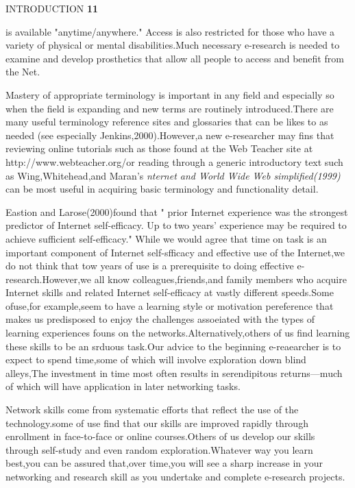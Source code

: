 \documentclass[10pt,a4paper]{book}
\begin{document}
\begin{flushright}
  INTRODUCTION \quad \textbf{11}
\end{flushright}


\!\!\!\!\!\!\!\!\!is available "anytime/anywhere." Access is also restricted for those who have a variety of physical or mental disabilities.Much necessary e-research is needed to examine and develop prosthetics that allow all people to access and benefit from the Net.


Mastery of appropriate terminology is important in any field and especially so when the field is expanding and new terms are routinely introduced.There are many useful terminology reference sites and glossaries that can be likes to as needed (see especially Jenkins,2000).However,a new e-researcher may fins that reviewing online tutorials such as those found at the Web Teacher site at http://www.webteacher.org/or reading through a generic introductory text such as Wing,Whitehead,and Maran's \textmd{\textit{nternet and World Wide Web simplified(1999)}} can be most useful in acquiring basic terminology and functionality detail.

Eastion and Larose(2000)found that " prior Internet experience was the strongest predictor of Internet self-efficacy. Up to two years' experience may be required to achieve sufficient self-efficacy." While we would agree that time on task is an important component of Internet self-sfficacy and effective use of the Internet,we do not think that tow years of use is a prerequisite to doing effective e-research.However,we all know colleagues,friends,and family members who acquire Internet skills and related Internet self-efficacy at vastly different speeds.Some ofuse,for example,seem to have a learning style or motivation pereference that makes us predisposed to enjoy the challenges assoeiated with the types of learning experiences founs on the networks.Alternatively,others of us find learning these skills to be an srduous task.Our advice to the beginning e-reaearcher is to expect to spend time,some of which will involve exploration down blind alleys,The investment in time most often results in serendipitous returns---much of which will have application in later networking tasks.

Network skills come from systematic efforts that reflect the use of the technology.some of use find that our skills are improved rapidly through enrollment in face-to-face or online courses.Others of us develop our skills through self-study and even random exploration.Whatever way you learn best,you can be assured that,over time,you will see a sharp increase in your networking and research skill as you undertake and complete e-research projects.
\end{document}
